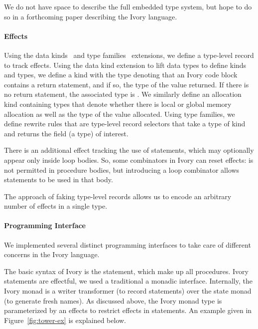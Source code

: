 We do not have space to describe the full embedded type system, but hope to do
so in a forthcoming paper describing the Ivory language.

\paragraph{Effects}

Using the data kinds~\cite{datakinds} and type
families~\cite{typefamilies} extensions, we define a type-level record to track
effects.  Using the data kind extension to lift data types to define kinds and
types, we define a kind  with the type  denoting that an
Ivory code block contains a return statement, and if so, the type of the value
returned.  If there is no return statement, the associated type is .
We similarly define an allocation kind containing types that denote whether
there is local or global memory allocation as well as the type of the value
allocated.  Using type families, we define rewrite rules that are type-level
record selectors that take a type of kind  and returns the field (a
type) of interest.

There is an additional effect tracking the use of
 statements, which may optionally appear only inside loop bodies.
So, some combinators in Ivory can reset effects:
 is not permitted in procedure bodies, but introducing a loop
combinator allows  statements to be used in that body.

The approach of faking
type-level records allows us to encode an arbitrary number of effects in a
single type.


\paragraph{Programming Interface}

We implemented several distinct programming interfaces to take care of different
concerns in the Ivory language.

The basic syntax of Ivory is the statement, which make up all procedures.
Ivory statements are effectful, we used a traditional a monadic interface.
Internally, the Ivory monad is a writer transformer (to record
statements) over the state monad (to generate fresh names). As discussed above,
the Ivory monad type is parameterized by an effects to restrict effects in
statements. An example given in Figure~\ref{fig:tower-ex} is explained below.

